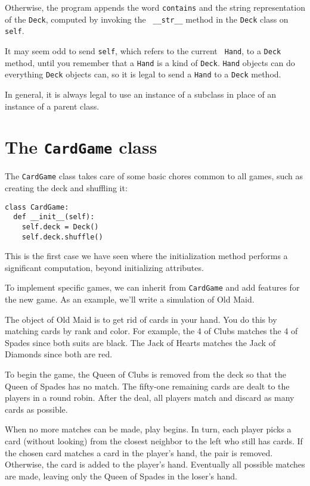 Otherwise, the program appends the word {\tt contains} and the string
representation of the {\tt Deck}, computed by invoking the {\tt
\_\_str\_\_} method in the {\tt Deck} class on {\tt self}.

It may seem odd to send {\tt self}, which refers to the current {\tt
Hand}, to a {\tt Deck} method, until you remember that a {\tt Hand} is
a kind of {\tt Deck}.  {\tt Hand} objects can do everything {\tt Deck}
objects can, so it is legal to send a {\tt Hand} to a {\tt Deck}
method.


In general, it is always legal to use an instance of a subclass
in place of an instance of a parent class.


\section {The {\tt CardGame} class}

The {\tt CardGame} class takes care
of some basic chores common to all games, such as creating the
deck and shuffling it:

\beforeverb
\begin{verbatim}
class CardGame:
  def __init__(self):
    self.deck = Deck()
    self.deck.shuffle()
\end{verbatim}
\afterverb
%
This is the first case we have seen where the initialization
method performs a significant computation, beyond initializing
attributes.

To implement specific games, we can inherit from {\tt CardGame}
and add features for the new game.
As an example, we'll write
a simulation of Old Maid.

The object of Old Maid is to get rid of cards in your hand.  You do
this by matching cards by rank and color.  For example, the 4 of Clubs
matches the 4 of Spades since both suits are black.  The Jack of Hearts
matches the Jack of Diamonds since both are red.

To begin the game, the Queen of Clubs is removed from the deck so that
the Queen of Spades has no match.  The fifty-one remaining cards are
dealt to the players in a round robin.  After the deal, all players
match and discard as many cards as possible.

When no more matches can be made, play begins.  In turn, each player
picks a card (without looking) from the closest neighbor to the left
who still has cards.  If the chosen card matches a card in the
player's hand, the pair is removed.  Otherwise, the card is added to
the player's hand.  Eventually all possible matches are made, leaving
only the Queen of Spades in the loser's hand.

